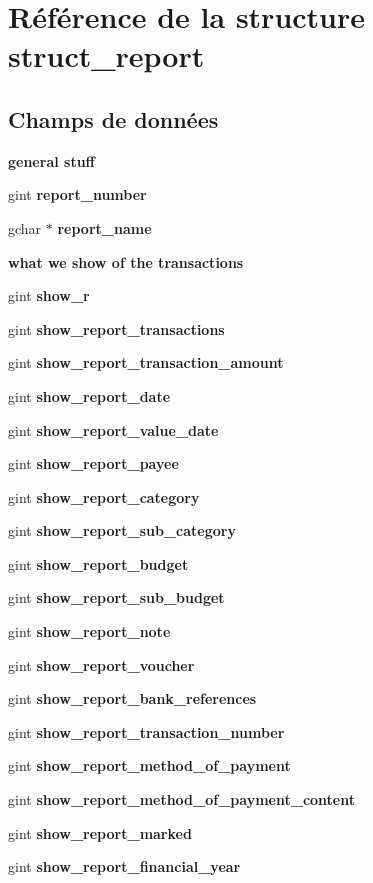 \section{Référence de la structure struct\_\-report}
\label{structstruct__report}
\subsection*{Champs de données}
\begin{Indent}{\bf general stuff}\par
{\em \label{_amgrp52b07cac44d92ce9f787d506234f1ad4}
 }\begin{DoxyCompactItemize}
\item 
gint {\bf report\_\-number}
\item 
gchar $\ast$ {\bf report\_\-name}
\end{DoxyCompactItemize}
\end{Indent}
\begin{Indent}{\bf what we show of the transactions}\par
{\em \label{_amgrp56989fbdf4b0c5695db4179afa95c2e1}
 }\begin{DoxyCompactItemize}
\item 
gint {\bf show\_\-r}
\item 
gint {\bf show\_\-report\_\-transactions}
\item 
gint {\bf show\_\-report\_\-transaction\_\-amount}
\item 
gint {\bf show\_\-report\_\-date}
\item 
gint {\bf show\_\-report\_\-value\_\-date}
\item 
gint {\bf show\_\-report\_\-payee}
\item 
gint {\bf show\_\-report\_\-category}
\item 
gint {\bf show\_\-report\_\-sub\_\-category}
\item 
gint {\bf show\_\-report\_\-budget}
\item 
gint {\bf show\_\-report\_\-sub\_\-budget}
\item 
gint {\bf show\_\-report\_\-note}
\item 
gint {\bf show\_\-report\_\-voucher}
\item 
gint {\bf show\_\-report\_\-bank\_\-references}
\item 
gint {\bf show\_\-report\_\-transaction\_\-number}
\item 
gint {\bf show\_\-report\_\-method\_\-of\_\-payment}
\item 
gint {\bf show\_\-report\_\-method\_\-of\_\-payment\_\-content}
\item 
gint {\bf show\_\-report\_\-marked}
\item 
gint {\bf show\_\-report\_\-financial\_\-year}
\end{DoxyCompactItemize}
\end{Indent}
